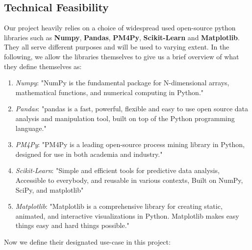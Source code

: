 \documentclass[12pt,a4paper]{article}
\begin{document}
\subsection{Technical Feasibility}
Our project heavily relies on a choice of widespread used open-source python libraries such as \textbf{Numpy}, \textbf{Pandas}, \textbf{PM4Py}, \textbf{Scikit-Learn} and \textbf{Matplotlib}. They all serve different purposes and will be used to varying extent. In the following, we allow the libraries themselves to give us a brief overview of what they define themselves as:
\begin{enumerate}
	\item \textit{Numpy}: "NumPy is the fundamental package for N-dimensional arrays, mathematical functions, and numerical computing in Python." \cite{numpy2026}
	\item \textit{Pandas}: "pandas is a fast, powerful, flexible and easy to use open source data analysis and manipulation tool, built on top of the Python programming language." \cite{pandas2026}
	\item \textit{PM4Py}: "PM4Py is a leading open-source process mining library in Python, designed for use in both academia and industry." \cite{pm4py2026}
	\item \textit{Scikit-Learn}: "Simple and efficient tools for predictive data analysis, Accessible to everybody, and reusable in various contexts, Built on NumPy, SciPy, and matplotlib" \cite{scikit-learn2026}
	\item \textit{Matplotlib}: "Matplotlib is a comprehensive library for creating static, animated, and interactive visualizations in Python. Matplotlib makes easy things easy and hard things possible." \cite{matplotlib2026}
\end{enumerate}
Now we define their designated use-case in this project:
\end{document}
